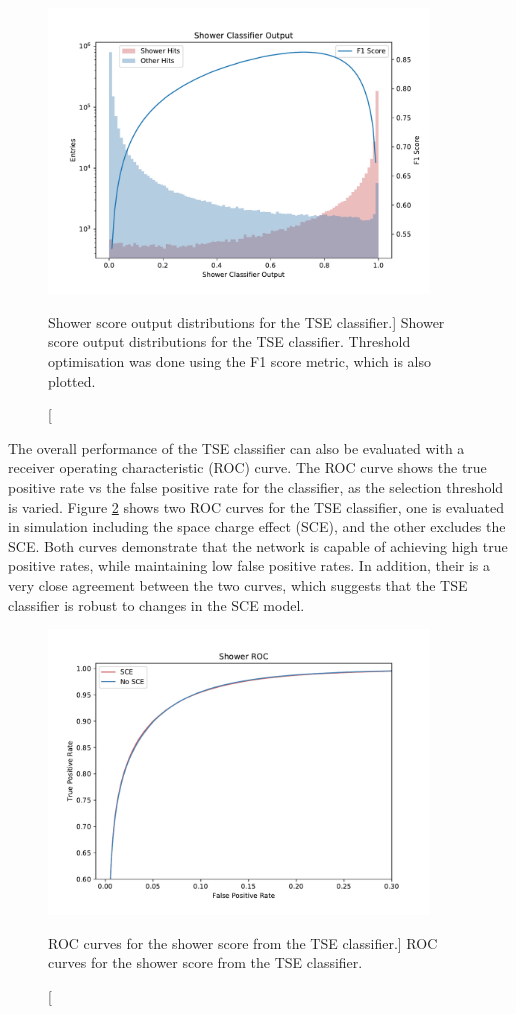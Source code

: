 \begin{figure}
	\centering
	\includegraphics[width=0.9\textwidth]{figures/shower_combined.pdf} 
	\caption
	[Shower score output distributions for the TSE classifier.]
	{Shower score output distributions for the TSE classifier. Threshold 
	optimisation was done using the F1 score metric, which is also plotted.}
	\label{fig:show_output}
\end{figure}

The overall performance of the TSE classifier can also be evaluated with a
receiver operating characteristic (ROC) curve\cite{Fawcett2006}. The ROC curve
shows the true positive rate vs the false positive rate for the classifier, as
the selection threshold is varied. Figure \ref{fig:show_roc} shows two ROC
curves for the TSE classifier, one is evaluated in simulation including
the space charge effect (SCE), and the other excludes the SCE. Both curves
demonstrate that the network is capable of achieving high true positive rates,
while maintaining low false positive rates. In addition, their is a very close
agreement between the two curves, which suggests that the TSE classifier is
robust to changes in the SCE model.

\begin{figure}
	\centering
	\includegraphics[width=0.9\textwidth]{figures/show_roc_comparison.pdf}
	\caption
	[ROC curves for the shower score from the TSE classifier.]
	{ROC curves for the shower score from the TSE classifier.}
	\label{fig:show_roc}
\end{figure}

